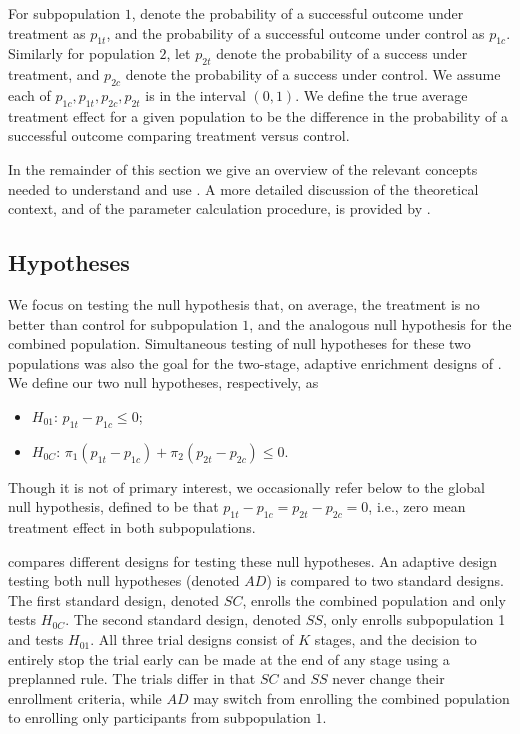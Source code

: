 \documentclass[article]{jss}
\begin{document}
For subpopulation $1$, denote the probability of a successful outcome under treatment as $p_{1t}$, and the probability of a successful outcome under control as $p_{1c}$. Similarly for population $2$, let $p_{2t}$ denote the probability of a success under treatment, and $p_{2c}$ denote the probability of a success under control. 
We assume each of $p_{1c},p_{1t},p_{2c},p_{2t}$ is in the interval $(0,1)$.
We define the true average treatment effect for a given population to be the difference in the probability of a successful outcome comparing treatment versus control.


In the remainder of this section we give an overview of the relevant concepts needed to understand and use . A more detailed discussion of the theoretical context, and of the parameter calculation procedure, is provided by \cite{Rosenblum2013AdaptMISTIE}.
 
\subsection{Hypotheses}
\label{sub:hypotheses}
We focus on testing the null hypothesis that, on average, the treatment is no better than control for subpopulation $1$, and the analogous null hypothesis for the combined population. Simultaneous testing of null hypotheses for these two populations was also the goal for the two-stage, adaptive enrichment designs of \cite{wangetal2007}.
We define our two null hypotheses, respectively, as

\begin{itemize}
\item $H_{01}$: $p_{1t}-p_{1c}≤0$;%
\item $H_{0C}$: $π_1(p_{1t}-p_{1c}) + π_2(p_{2t}-p_{2c}) ≤ 0$. %
\end{itemize}

Though it is not of primary interest, we occasionally refer below to the global null hypothesis, defined  to be that $p_{1t}-p_{1c}=p_{2t}-p_{2c}=0$, i.e., zero mean treatment effect in both subpopulations.

 compares different designs for testing these null hypotheses. 
An adaptive design testing both null hypotheses (denoted $AD$) is compared to two standard designs. The first standard design, denoted $SC$, enrolls the combined population and only tests $H_{0C}$. The second standard design, denoted $SS$, only enrolls subpopulation 1 and tests $H_{01}$.
All three trial designs consist of $K$ stages, and the decision to entirely stop the trial early can be made at the end of any stage using a preplanned rule. The trials differ in that $SC$ and $SS$ never change their enrollment criteria, while $AD$ may switch from enrolling the combined population  to enrolling only participants from subpopulation $1$.
\end{document}
